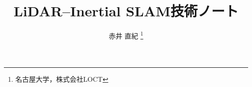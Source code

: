 \documentclass[uplatex,dvipdfmx,a4paper]{jsbook}
\theoremstyle{plain}%
\theoremstyle{definition}
\theoremstyle{remark}
\begin{document}

\title{LiDAR--Inertial SLAM技術ノート}
\author{赤井 直紀%
  \thanks{名古屋大学，株式会社LOCT}
}

\maketitle

% 















\end{document}
